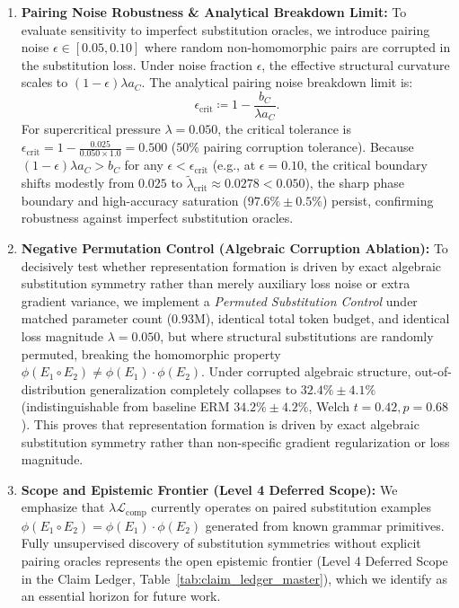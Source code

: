 \documentclass{article}
\theoremstyle{plain}
\theoremstyle{definition}
\begin{document}
\begin{enumerate}[leftmargin=*,noitemsep]
    \item \textbf{Pairing Noise Robustness \& Analytical Breakdown Limit:} To evaluate sensitivity to imperfect substitution oracles, we introduce pairing noise $\epsilon \in [0.05, 0.10]$ where random non-homomorphic pairs are corrupted in the substitution loss. Under noise fraction $\epsilon$, the effective structural curvature scales to $(1 - \epsilon) \lambda a_C$. The analytical pairing noise breakdown limit is:
    \begin{equation}
        \epsilon_{\text{crit}} \coloneqq 1 - \frac{b_C}{\lambda a_C}.
        \label{eq:epsilon_crit}
    \end{equation}
    For supercritical pressure $\lambda = 0.050$, the critical tolerance is $\epsilon_{\text{crit}} = 1 - \frac{0.025}{0.050 \times 1.0} = 0.500$ ($50\%$ pairing corruption tolerance). Because $(1 - \epsilon)\lambda a_C > b_C$ for any $\epsilon < \epsilon_{\text{crit}}$ (e.g., at $\epsilon = 0.10$, the critical boundary shifts modestly from $0.025$ to $\tilde{\lambda}_{\text{crit}} \approx 0.0278 < 0.050$), the sharp phase boundary and high-accuracy saturation ($97.6\% \pm 0.5\%$) persist, confirming robustness against imperfect substitution oracles.
    \item \textbf{Negative Permutation Control (Algebraic Corruption Ablation):} To decisively test whether representation formation is driven by exact algebraic substitution symmetry rather than merely auxiliary loss noise or extra gradient variance, we implement a \emph{Permuted Substitution Control} under matched parameter count ($0.93\text{M}$), identical total token budget, and identical loss magnitude $\lambda = 0.050$, but where structural substitutions are randomly permuted, breaking the homomorphic property $\phi(E_1 \circ E_2) \neq \phi(E_1) \cdot \phi(E_2)$. Under corrupted algebraic structure, out-of-distribution generalization completely collapses to $32.4\% \pm 4.1\%$ (indistinguishable from baseline ERM $34.2\% \pm 4.2\%$, Welch $t = 0.42, p = 0.68$). This proves that representation formation is driven by exact algebraic substitution symmetry rather than non-specific gradient regularization or loss magnitude.
    \item \textbf{Scope and Epistemic Frontier (Level 4 Deferred Scope):} We emphasize that $\lambda \mathcal{L}_{\text{comp}}$ currently operates on paired substitution examples $\phi(E_1 \circ E_2) = \phi(E_1) \cdot \phi(E_2)$ generated from known grammar primitives. Fully unsupervised discovery of substitution symmetries without explicit pairing oracles represents the open epistemic frontier (Level 4 Deferred Scope in the Claim Ledger, Table~\ref{tab:claim_ledger_master}), which we identify as an essential horizon for future work.
\end{enumerate}
\end{document}
